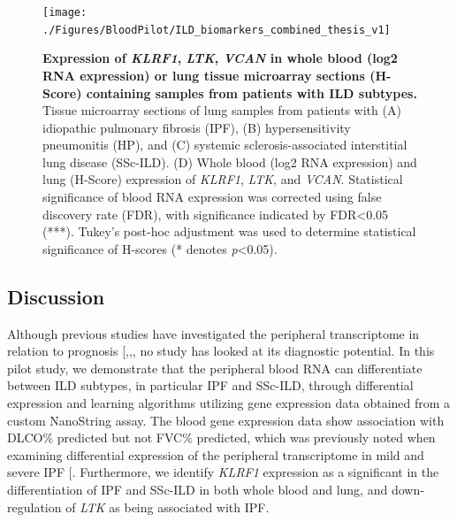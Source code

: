 \documentclass[
]{article}
\begin{document}
\begin{figure}

{\centering \texttt{[image: ./Figures/BloodPilot/ILD\_biomarkers\_combined\_thesis\_v1]} 

}

\caption[Blood and lung expression of LTK, KLRF1, VCAN]{\textbf{Expression of \textit{KLRF1}, \textit{LTK}, \textit{VCAN} in whole blood (log2 RNA expression) or lung tissue microarray sections (H-Score) containing samples from patients with ILD subtypes.} Tissue microarray sections of lung samples from patients with (A) idiopathic pulmonary fibrosis (IPF), (B) hypersensitivity pneumonitis (HP), and (C) systemic sclerosis-associated interstitial lung disease (SSc-ILD). (D) Whole blood (log2 RNA expression) and lung (H-Score) expression of \textit{KLRF1}, \textit{LTK}, and \textit{VCAN}. Statistical significance of blood RNA expression was corrected using false discovery rate (FDR), with significance indicated by FDR\textless0.05 (***). Tukey's post-hoc adjustment was used to determine statistical significance of H-scores (* denotes \textit{p}\textless0.05).}\label{fig:pilotexpr}
\end{figure}

\subsection{Discussion}\label{discussion-1}

Although previous studies have investigated the peripheral transcriptome in relation to prognosis {[},,\citeproc{ref-fernandez_perez_prognostic_2022}{102}{]}, no study has looked at its diagnostic potential. In this pilot study, we demonstrate that the peripheral blood RNA can differentiate between ILD subtypes, in particular IPF and SSc-ILD, through differential expression and learning algorithms utilizing gene expression data obtained from a custom NanoString assay. The blood gene expression data show association with DLCO\% predicted but not FVC\% predicted, which was previously noted when examining differential expression of the peripheral transcriptome in mild and severe IPF {[}\citeproc{ref-yang_peripheral_2012}{54}{]}. Furthermore, we identify \textit{KLRF1} expression as a significant in the differentiation of IPF and SSc-ILD in both whole blood and lung, and down-regulation of \textit{LTK} as being associated with IPF.
\end{document}
